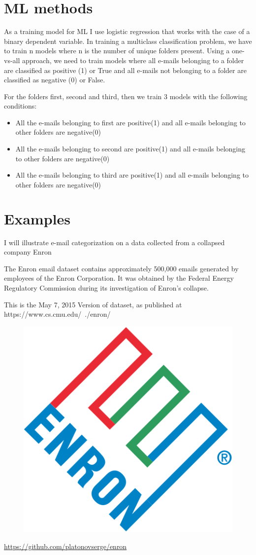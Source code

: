 \documentclass[11pt,fleqn]{book} %
\begin{document}
\section{ML methods}
As a training model for ML I use logistic regression that works with the case of a binary dependent variable. In training a multiclass classification problem, we have to train n models where n is the number of unique folders present. Using a one-vs-all approach, we need to train models where all e-mails belonging to a folder are classified as positive (1) or True and all e-mails not belonging to a folder are classified as negative (0) or False.

For the folders first, second and third, then we train 3 models with the following conditions:
\begin{itemize}
\item All the e-mails belonging to first are positive(1) and all e-mails belonging to other folders are negative(0)

\item All the e-mails belonging to second are positive(1) and all e-mails belonging to other folders are negative(0)

\item All the e-mails belonging to third are positive(1) and all e-mails belonging to other folders are negative(0)
\end{itemize}

\section{Examples}

I will illustrate e-mail categorization on a data collected from a collapsed company Enron 
\begin{remark}
The Enron email dataset contains approximately 500,000 emails generated by employees of the Enron Corporation. It was obtained by the Federal Energy Regulatory Commission during its investigation of Enron's collapse.

This is the May 7, 2015 Version of dataset, as published at https://www.cs.cmu.edu/~./enron/
\begin{figure}[h]
\center
\includegraphics[width=0.3\linewidth]{Pictures/enron.png}
\end{figure}
\end{remark}
\url{https://github.com/platonovserge/enron}
\end{document}
